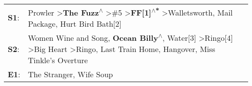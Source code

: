 \begin{supertabular}{p{0.03\textwidth}p{0.92\textwidth}}
 \textbf{S1}:  &                                                                       Prowler\textsuperscript{} \textgreater \enspace \textbf{The Fuzz\textsuperscript{$\wedge$}} \textgreater \enspace \#5\textsuperscript{} \textgreater \enspace \textbf{FF[1]\textsuperscript{$\wedge$*}} \textgreater \enspace Walletsworth\textsuperscript{}, \enspace Mail Package\textsuperscript{}, \enspace Hurt Bird Bath[2]\textsuperscript{}  \enspace  \\
 \textbf{S2}:  &  Women Wine and Song\textsuperscript{}, \enspace \textbf{Ocean Billy\textsuperscript{$\wedge$}}, \enspace Water[3]\textsuperscript{} \textgreater \enspace Ringo[4]\textsuperscript{} \textgreater \enspace Big Heart\textsuperscript{} \textgreater \enspace Ringo\textsuperscript{}, \enspace Last Train Home\textsuperscript{}, \enspace Hangover\textsuperscript{}, \enspace Miss Tinkle's Overture\textsuperscript{}  \enspace  \\
 \textbf{E1}:  &                                                                                                                                                                                                                                                                                                                                                      The Stranger\textsuperscript{}, \enspace Wife Soup\textsuperscript{}  \enspace  \\
\end{supertabular}
